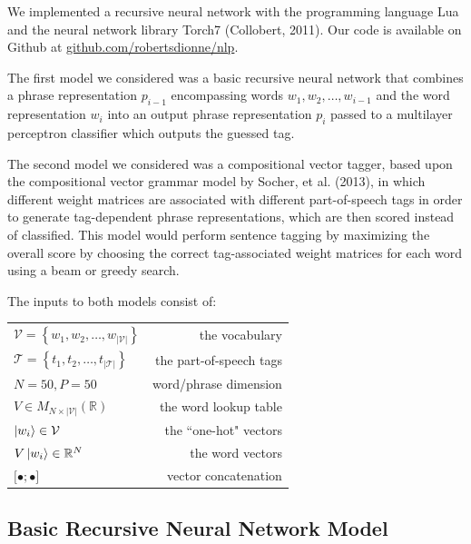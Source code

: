 \documentclass[11pt]{article}
\begin{document}
We implemented a recursive neural network with the programming language Lua and the neural network library Torch7 (Collobert, 2011). Our code is available on Github at \hyperlink{http://github.com/robertsdionne/nlp}{github.com/robertsdionne/nlp}.

The first model we considered was a basic recursive neural network that combines a phrase representation $p_{i-1}$ encompassing words $w_1,w_2,\ldots,w_{i-1}$ and the word representation $w_i$ into an output phrase representation $p_i$ passed to a multilayer perceptron classifier which outputs the guessed tag.

The second model we considered was a compositional vector tagger, based upon the compositional vector grammar model by Socher, et al. (2013), in which different weight matrices are associated with different part-of-speech tags in order to generate tag-dependent phrase representations, which are then scored instead of classified. This model would perform sentence tagging by maximizing the overall score by choosing the correct tag-associated weight matrices for each word using a beam or greedy search.

The inputs to both models consist of:

\begin{center}
\begin{tabular}{ l r }
  $\mathcal{V} = \left\{w_1,w_2,\ldots,w_{\left\vert\mathcal{V}\right\vert}\right\}$ & the vocabulary \\
  $\mathcal{T} = \left\{t_1,t_2,\ldots,t_{\left\vert\mathcal{T}\right\vert}\right\}$ & the part-of-speech tags \\
  $N = 50, P = 50$ & word/phrase dimension \\
  $V\in M_{N\times\left\vert\mathcal{V}\right\vert}(\mathbb{R})$ & the word lookup table \\
  $\Ket{w_i}\in\mathcal{V}$ & the ``one-hot" vectors \\
  $V\Ket{w_i}\in\mathbb{R}^N$ & the word vectors \\
  $\Big[\bullet;\bullet\Big]$ & vector concatenation \\
\end{tabular}
\end{center}
\vspace{5mm}

\subsection{Basic Recursive Neural Network Model}
\end{document}

